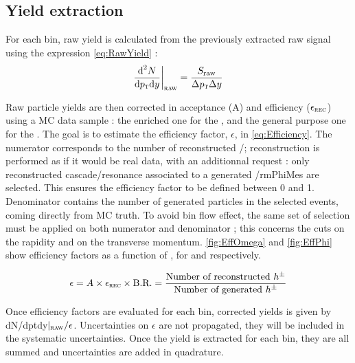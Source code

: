\subsection{Yield extraction}
\label{sec:Section04.c-}

For each \pT bin, raw yield is calculated from the previously extracted raw signal using the expression \eq \ref{eq:RawYield} :
\begin{equation}
\frac{\text{d}^2 N}{\text{d}p_{\text{\textsc{t}}} \text{d} y} \bigg\rvert_\textsc{raw} = \frac{S_\text{raw}}{\Delta p_{\text{\textsc{t}}} \Delta y}
\end{equation}\label{eq:RawYield}

Raw particle yields are then corrected in acceptance (A) and efficiency ($\epsilon_\textsc{rec}$) using a MC data sample : the enriched one for the \rmOmega, and the general purpose one for the \rmPhiMes. The goal is to estimate the efficiency factor, $\epsilon$, in \eq \ref{eq:Efficiency}. The numerator corresponds to the number of reconstructed \rmOmega/\rmPhiMes; reconstruction is performed as if it would be real data, with an additionnal request : only reconstructed cascade/resonance associated to a generated \rmOmega/rmPhiMes are selected. This ensures the efficiency factor to be defined between 0 and 1. Denominator contains the number of generated particles in the selected events, coming directly from MC truth. To avoid bin flow effect, the same set of selection must be applied on both numerator and denominator ; this concerns the cuts on the rapidity and on the transverse momentum. \fig \ref{fig:EffOmega} and \ref{fig:EffPhi} show efficiency factors as a function of \pT, for \rmOmega and \rmPhiMes respectively.

\begin{equation}
\epsilon = A\times \epsilon_\textsc{rec} \times \text{B.R.} = \frac{\text{Number of reconstructed \ensuremath{h^{\pm}}}}{\text{Number of generated \ensuremath{h^{\pm}}}}
\end{equation}
\label{eq:Efficiency}


Once efficiency factors are evaluated for each \pT bin, corrected yields is given by dN/dptdy$|_\textsc{raw}/\epsilon$. Uncertainties on $\epsilon$ are not propagated, they will be included in the systematic uncertainties. Once the yield is extracted for each \pT bin, they are all summed and uncertainties are added in quadrature. 

